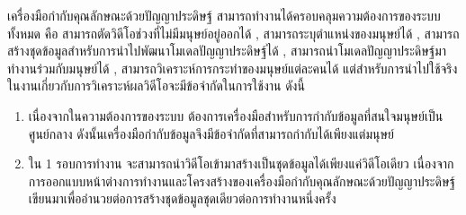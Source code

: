 เครื่องมือกำกับคุณลักษณะด้วยปัญญาประดิษฐ์ สามารถทำงานได้ครอบคลุมความต้องการของระบบทั้งหมด คือ สามารถตัดวิดีโอช่วงที่ไม่มีมนุษย์อยู่ออกได้ , สามารถระบุตำแหน่งของมนุษย์ได้ , สามารถสร้างชุดข้อมูลสำหรับการนำไปพัฒนาโมเดลปัญญาประดิษฐ์ได้ , สามารถนำโมเดลปัญญาประดิษฐ์มาทำงานร่วมกับมนุษย์ได้ , สามารถวิเคราะห์การกระทำของมนุษย์แต่ละคนได้ แต่สำหรับการนำไปใช้จริงในงานเกี่ยวกับการวิเคราะห์ผลวิดีโอจะมีข้อจำกัดในการใช้งาน ดังนี้
\begin{enumerate}
	\item เนื่องจากในความต้องการของระบบ ต้องการเครื่องมือสำหรับการกำกับข้อมูลที่สนใจมนุษย์เป็นศูนย์กลาง ดังนั้นเครื่องมือกำกับข้อมูลจึงมีข้อจำกัดที่สามารถกำกับได้เพียงแต่มนุษย์
	\item ใน 1 รอบการทำงาน จะสามารถนำวิดีโอเข้ามาสร้างเป็นชุดข้อมูลได้เพียงแค่วิดีโอเดียว เนื่องจาก การออกแบบหน้าต่างการทำงานและโครงสร้างของเครื่องมือกำกับคุณลักษณะด้วยปัญญาประดิษฐ์เขียนมาเพื่ออำนวยต่อการสร้างชุดข้อมูลชุดเดียวต่อการทำงานหนึ่งครั้ง
\end{enumerate}	